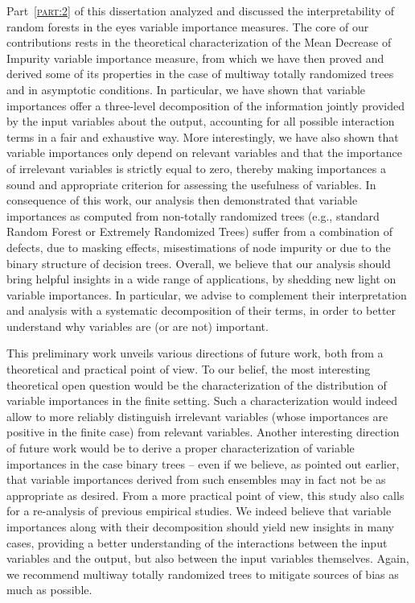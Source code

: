 Part~\textsc{\ref{part:2}} of this dissertation analyzed and discussed the
interpretability of random forests in the eyes variable importance measures.
The core of our contributions rests in the theoretical characterization of the
Mean Decrease of Impurity variable importance measure, from which we have then
proved and derived some of its properties in the case of multiway totally
randomized trees and in asymptotic conditions. In particular, we have shown
that variable importances offer a three-level decomposition of the information
jointly provided by the input variables about the output, accounting for all
possible interaction terms in a fair and exhaustive way. More interestingly, we
have also shown that variable importances only depend on relevant variables and
that the importance of irrelevant variables is strictly equal to zero, thereby
making importances a sound and appropriate criterion for assessing the
usefulness of variables. In consequence of this work, our analysis then
demonstrated that variable importances as computed from non-totally randomized
trees (e.g., standard Random Forest or Extremely Randomized Trees) suffer from
a combination of defects, due to masking effects, misestimations of node
impurity or due to the binary structure of decision trees. Overall, we believe
that our analysis should bring helpful insights in a wide range of
applications, by shedding new light on variable importances. In particular, we
advise to complement their interpretation and analysis with a systematic
decomposition of their terms, in order to better understand why variables are
(or are not) important.

This preliminary work unveils various directions of future work, both from a
theoretical and practical point of view. To our belief, the most interesting
theoretical open question would be the characterization of the distribution of
variable importances in the finite setting. Such a characterization would
indeed allow to more reliably distinguish irrelevant variables (whose
importances are positive in the finite case) from relevant variables. Another
interesting direction of future work would be to derive a proper
characterization of variable importances in the case binary trees -- even if we
believe, as pointed out earlier, that variable importances derived from such
ensembles may in fact not be as appropriate as desired. From a more practical
point of view, this study also calls for a re-analysis of previous empirical
studies. We indeed believe that variable importances along with their
decomposition should yield new insights in many cases, providing a better
understanding of the interactions between the input variables and the output,
but also between the input variables themselves. Again, we recommend multiway
totally randomized trees to mitigate sources of bias as much as possible.

